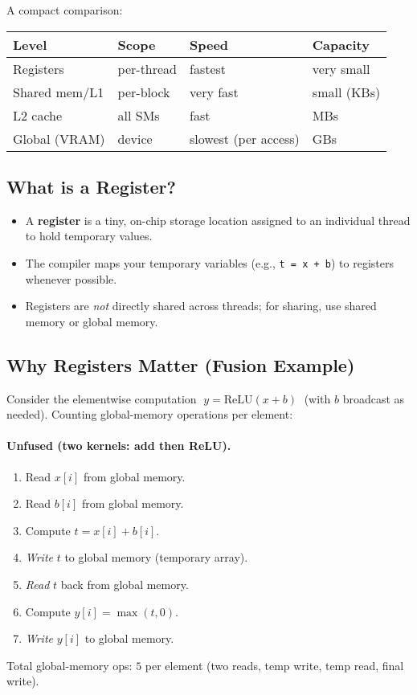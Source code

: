 \noindent A compact comparison:
\begin{center}
\begin{tabular}{llll}
\hline
\textbf{Level} & \textbf{Scope} & \textbf{Speed} & \textbf{Capacity} \\
\hline
Registers & per-thread & fastest & very small \\
Shared mem/L1 & per-block & very fast & small (KBs) \\
L2 cache & all SMs & fast & MBs \\
Global (VRAM) & device & slowest (per access) & GBs \\
\hline
\end{tabular}
\end{center}

\subsection{What is a Register?}
\begin{itemize}
\item A \textbf{register} is a tiny, on-chip storage location assigned to an individual thread to hold temporary values.
\item The compiler maps your temporary variables (e.g., \verb|t = x + b|) to registers whenever possible.
\item Registers are \emph{not} directly shared across threads; for sharing, use shared memory or global memory.
\end{itemize}

\subsection{Why Registers Matter (Fusion Example)}
Consider the elementwise computation $\;y = \mathrm{ReLU}(x + b)\;$ (with $b$ broadcast as needed). Counting global-memory operations per element:

\paragraph{Unfused (two kernels: add then ReLU).}
\begin{enumerate}
\item Read $x[i]$ from global memory.
\item Read $b[i]$ from global memory.
\item Compute $t = x[i] + b[i]$.
\item \emph{Write} $t$ to global memory (temporary array).
\item \emph{Read} $t$ back from global memory.
\item Compute $y[i] = \max(t, 0)$.
\item \emph{Write} $y[i]$ to global memory.
\end{enumerate}
Total global-memory ops: $5$ per element (two reads, temp write, temp read, final write).

